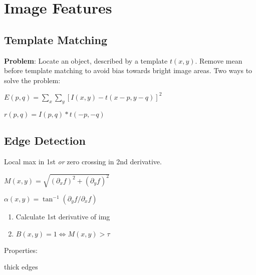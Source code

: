 \section{Image Features}

\subsection{Template Matching}
\textbf{Problem}: Locate an object, described by a template \(t(x, y)\).
{\color{H1}Remove mean before template matching to avoid bias towards bright image areas.}
Two ways to solve the problem:

\begin{definition}
  \(E(p, q) = \sum_{x} \sum_{y}[I(x, y) - t(x - p, y - q)]^2\)
\end{definition}

\begin{definition}
  \(r(p, q) = I(p, q) \ast t(-p, -q)\)
\end{definition}

\subsection{Edge Detection}

\begin{definition}[Edge]
  Local max in 1st \textit{or} zero crossing in 2nd derivative.
\end{definition}

\begin{definition}
  \(M(x, y) = \sqrt{\left(\partial_x f\right)^2 + \left(\partial_y f\right)^2}\)
\end{definition}

\begin{definition}
  \(\alpha(x, y) = \tan^{-1}\left(\partial_y f / \partial_x f\right)\)
\end{definition}

\begin{algorithm}
  \begin{enumerate}
    \item Calculate 1st derivative of img
    \item \(B(x, y) = 1 \iff M(x, y) > \tau\)
  \end{enumerate}

  Properties:
  \begin{itemize*}
    \item thick edges
  \end{itemize*}
\end{algorithm}

